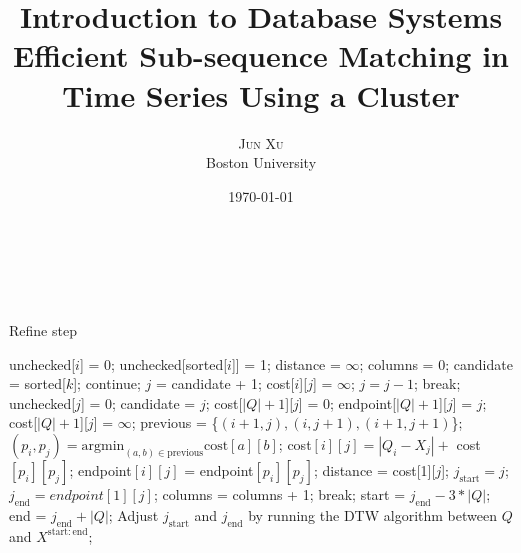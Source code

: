 \documentclass{article}
\title{\textbf{Introduction to Database Systems} \\
	Efficient Sub-sequence Matching in Time Series Using a Cluster}
\author{\textsc{Jun Xu}
	\\{Boston University}}
\date{\today}
\makeatletter
\renewcommand{\maketitle}{
	\begin{flushright}
		{\LARGE\@title}

		\vspace{50pt}

		{\large\@author}
		\\\@date

		\vspace{30pt}
	\end{flushright}
}
\makeatother
\begin{document}
\maketitle

\section*{}
\begin{algorithm}
	\caption{Refine step}
	\begin{algorithmic}[1]
			\State unchecked[$i$] = 0;
		\EndFor
		\State unchecked[sorted[$i$]] = 1;
	\EndFor
		\State distance = $\infty$;
		\State	columns = 0;
		\State candidate = sorted[$k$];
			\State continue;
		\EndIf
		\State $j$ = candidate + 1;
			\State cost[$i$][$j$] = $\infty$;
		\EndFor
			\State $j = j - 1$;
				\State break;
			\EndIf
				\State unchecked[$j$] = 0;
				\State candidate = $j$;
				\State cost[$|Q|+1$][$j$] = 0;
				\State endpoint[$|Q|+1$][$j$] = $j$;
			\Else
				\State cost[$|Q|+1$][$j$] = $\infty$;
			\EndIf
				\State previous = \{$(i+1, j), (i, j+1), (i+1, j+1)$\};
				\State $(p_i, p_j) = \mathrm{argmin}_{(a,b)\in\mathrm{previous}}\mathrm{cost}[a][b]$;
				\State cost$[i][j] = |Q_i - X_j| +$ cost$[p_i][p_j]$;
				\State endpoint$[i][j]$ = endpoint$[p_i][p_j]$;
			\EndFor
				\State distance = cost[1][$j$];
				\State $j_{\mathrm{start}} = j$;
				\State $j_{\mathrm{end}} = endpoint[1][j]$;
			\EndIf
			\State columns = columns + 1;
				\State break;
			\EndIf
		\EndWhile
	\EndFor
	\State start = $j_{\mathrm{end}} - 3*|Q|$;
	\State end = $j_{\mathrm{end}} + |Q|$;
	\State Adjust $j_{\mathrm{start}}$ and $j_{\mathrm{end}}$ by running the DTW algorithm between $Q$ and $X^{\mathrm{start:end}}$;
	\end{algorithmic}
\end{algorithm}
\end{document}
